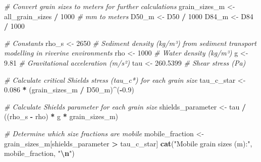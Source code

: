 \documentclass[
]{article}
\newenvironment{Shaded}{\begin{snugshade}}{\end{snugshade}}
\newcommand{\CommentTok}[1]{\textcolor[rgb]{0.56,0.35,0.01}{\textit{#1}}}
\newcommand{\DecValTok}[1]{\textcolor[rgb]{0.00,0.00,0.81}{#1}}
\newcommand{\FloatTok}[1]{\textcolor[rgb]{0.00,0.00,0.81}{#1}}
\newcommand{\FunctionTok}[1]{\textcolor[rgb]{0.13,0.29,0.53}{\textbf{#1}}}
\newcommand{\NormalTok}[1]{#1}
\newcommand{\OtherTok}[1]{\textcolor[rgb]{0.56,0.35,0.01}{#1}}
\newcommand{\SpecialCharTok}[1]{\textcolor[rgb]{0.81,0.36,0.00}{\textbf{#1}}}
\newcommand{\StringTok}[1]{\textcolor[rgb]{0.31,0.60,0.02}{#1}}
\begin{document}
\begin{Shaded}
\begin{Highlighting}[]
\CommentTok{\# Convert grain sizes to meters for further calculations}
\NormalTok{grain\_sizes\_m }\OtherTok{\textless{}{-}}\NormalTok{ all\_grain\_sizes }\SpecialCharTok{/} \DecValTok{1000}  \CommentTok{\# mm to meters}
\NormalTok{D50\_m }\OtherTok{\textless{}{-}}\NormalTok{ D50 }\SpecialCharTok{/} \DecValTok{1000}
\NormalTok{D84\_m }\OtherTok{\textless{}{-}}\NormalTok{ D84 }\SpecialCharTok{/} \DecValTok{1000}

\CommentTok{\# Constants}
\NormalTok{rho\_s }\OtherTok{\textless{}{-}} \DecValTok{2650}  \CommentTok{\# Sediment density (kg/m³) from sediment transport modelling in riverine environments}
\NormalTok{rho }\OtherTok{\textless{}{-}} \DecValTok{1000}    \CommentTok{\# Water density (kg/m³)}
\NormalTok{g }\OtherTok{\textless{}{-}} \FloatTok{9.81}      \CommentTok{\# Gravitational acceleration (m/s²)}
\NormalTok{tau }\OtherTok{\textless{}{-}} \FloatTok{260.5399}  \CommentTok{\# Shear stress (Pa)}

\CommentTok{\# Calculate critical Shields stress (tau\_c*) for each grain size}
\NormalTok{tau\_c\_star }\OtherTok{\textless{}{-}} \FloatTok{0.086} \SpecialCharTok{*}\NormalTok{ (grain\_sizes\_m }\SpecialCharTok{/}\NormalTok{ D50\_m)}\SpecialCharTok{\^{}}\NormalTok{(}\SpecialCharTok{{-}}\FloatTok{0.9}\NormalTok{)}

\CommentTok{\# Calculate Shields parameter for each grain size}
\NormalTok{shields\_parameter }\OtherTok{\textless{}{-}}\NormalTok{ tau }\SpecialCharTok{/}\NormalTok{ ((rho\_s }\SpecialCharTok{{-}}\NormalTok{ rho) }\SpecialCharTok{*}\NormalTok{ g }\SpecialCharTok{*}\NormalTok{ grain\_sizes\_m)}

\CommentTok{\# Determine which size fractions are mobile}
\NormalTok{mobile\_fraction }\OtherTok{\textless{}{-}}\NormalTok{ grain\_sizes\_m[shields\_parameter }\SpecialCharTok{\textgreater{}}\NormalTok{ tau\_c\_star]}
\FunctionTok{cat}\NormalTok{(}\StringTok{"Mobile grain sizes (m):"}\NormalTok{, mobile\_fraction, }\StringTok{"}\SpecialCharTok{\textbackslash{}n}\StringTok{"}\NormalTok{)}
\end{Highlighting}
\end{Shaded}
\end{document}
